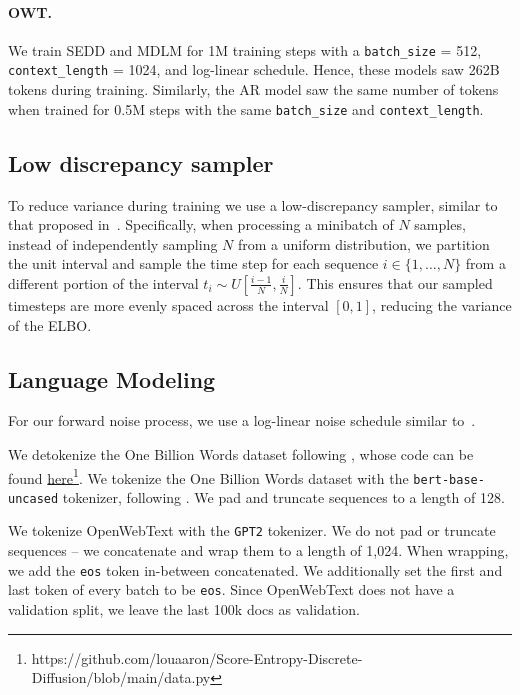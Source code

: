 \documentclass{article} %
\def\algo{MDLM}
\def\owt{OWT}
\begin{document}
{\begin{appendices}
\paragraph{\owt{}.} We train SEDD and \algo{} for 1M training steps with a \texttt{batch\_size} = 512, \texttt{context\_length} = 1024, and log-linear schedule. Hence, these models saw  262B tokens during training. Similarly, the AR model saw the same number of tokens when trained for 0.5M steps with the same \texttt{batch\_size} and  \texttt{context\_length}.

\subsection{Low discrepancy sampler}
\label{supp:sec:low_discrepancy_sampler}
To reduce variance during training we use a low-discrepancy sampler, similar to that proposed in~\citet{kingma2021variational}. 
Specifically, when processing a minibatch of $N$ samples, instead of independently sampling $N$ from a uniform distribution, we partition the unit interval and sample the time step for each sequence $i \in \{1,\ldots,N\}$ from a different portion of the interval $t_i \sim U[\frac{i - 1}{N}, \frac{i}{N}]$.
This ensures that our sampled timesteps are more evenly spaced across the interval $[0, 1]$, reducing the variance of the ELBO.


\subsection{Language Modeling}
\label{appendix:hyperparameters:lm}
For our forward noise process, we use a log-linear noise schedule similar to~\citet{lou2023discrete}.

We detokenize the One Billion Words dataset following \citet{lou2023discrete}, whose code can be found \href{https://github.com/louaaron/Score-Entropy-Discrete-Diffusion/blob/main/data.py}{here}\footnote{https://github.com/louaaron/Score-Entropy-Discrete-Diffusion/blob/main/data.py}.
We tokenize the One Billion Words dataset with the \texttt{bert-base-uncased} tokenizer, following \citet{he2022diffusionbert}. We pad and truncate sequences to a length of 128.

We tokenize OpenWebText with the \texttt{GPT2} tokenizer. We do not pad or truncate sequences -- we concatenate and wrap them to a length of 1,024. When wrapping, we add the \texttt{eos} token in-between concatenated. We additionally set the first and last token of every batch to be \texttt{eos}.
Since OpenWebText does not have a validation split, we leave the last 100k docs as validation.


\end{appendices}}
\end{document}
